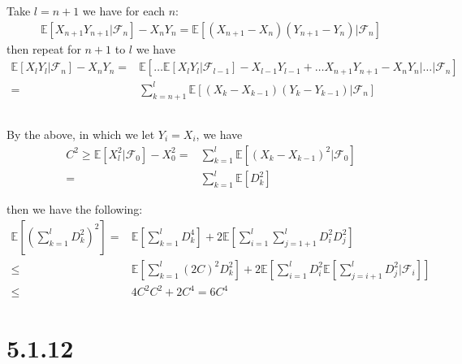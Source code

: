 \documentclass[11pt,a4paper]{ctexart}
\numberwithin{equation}{section}%
\newcommand{\F}{\mathcal{F}}
\begin{document}
Take $ l=n+1 $ we have for each $ n $:
\begin{align*}
    \mathbb{E}\left[ X_{n+1}Y_{n+1}|\F_n \right] - X_nY_n = \mathbb{E}\left[ (X_{n+1}-X_n)(Y_{n+1}-Y_n)|\F_n \right] 
\end{align*}
then repeat for $ n+1 $ to $ l $ we have
\begin{align*}
    \mathbb{E}\left[ X_lY_l|\F_n \right] - X_nY_n  =& \mathbb{E}\left[\ldots \mathbb{E}\left[ X_lY_l|\F_{l-1} \right] -X_{l-1}Y_{l-1} + \ldots X_{n+1}Y_{n+1}-X_{n}Y_{n} | \ldots | \F_n \right] \\
    =& \sum_{k=n+1}^l \mathbb{E}\left[ (X_k-X_{k-1})(Y_{k}-Y_{k-1}) |\F_n \right] 
\end{align*}


\subsection{}

By the above, in which we let $ Y_i=X_i $, we have
\begin{align*}
    C^2\geq \mathbb{E}\left[ X_l^2|\mathcal{F}_0 \right]  -X_0^2 = & \sum_{k=1}^l \mathbb{E}\left[ (X_k-X_{k-1})^2|\mathcal{F}_0 \right] \\
    =& \sum_{k=1}^l \mathbb{E}\left[ D_k^2 \right] 
\end{align*}

then we have the following:
\begin{align*}
    \mathbb{E}\left[ (\sum_{k=1}^l D_k^2)^2 \right]  =& \mathbb{E}\left[ \sum_{k=1}^l D_k^4 \right] + 2\mathbb{E}\left[ \sum_{i=1}^l\sum_{j=1+1}^l D_i^2D_j^2 \right] \\
    \leq & \mathbb{E}\left[ \sum_{k=1}^l (2C)^2 D_k^2 \right] + 2\mathbb{E}\left[ \sum_{i=1}^lD_i^2 \mathbb{E}\left[ \sum_{j=i+1}^l D_j^2 | \mathcal{F}_i \right]  \right] \\
    \leq& 4C^2C^2 + 2C^4 = 6C^4
\end{align*}





\section{5.1.12}
\end{document}
